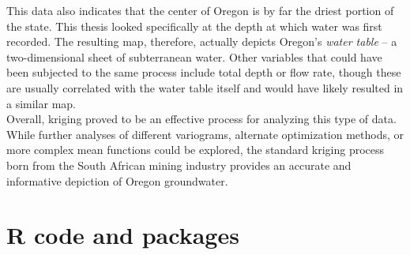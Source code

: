 \documentclass[12pt,twoside]{reedthesis}
\begin{document}
This data also indicates that the center of Oregon is by far the driest portion of the state. This thesis looked specifically at the depth at which water was first recorded. The resulting map, therefore, actually depicts Oregon's \emph{water table} -- a two-dimensional sheet of subterranean water. Other variables that could have been subjected to the same process include total depth or flow rate, though these are usually correlated with the water table itself and would have likely resulted in a similar map. \\

Overall, kriging proved to be an effective process for analyzing this type of data. While further analyses of different variograms, alternate optimization methods, or more complex mean functions could be explored, the standard kriging process born from the South African mining industry provides an accurate and informative depiction of Oregon groundwater.


    \appendix
      \chapter{R code and packages}



  \backmatter %

    \nocite{*}

\renewcommand{\bibname}{Bibliography}


 

\end{document}
